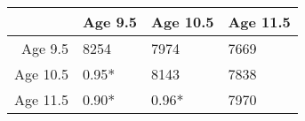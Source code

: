 \begin{table}[ht]
\centering
\begin{tabular}{rlll}
  \hline
 & Age 9.5 & Age 10.5 & Age 11.5 \\ 
  \hline
Age 9.5 & 8254 & 7974 & 7669 \\ 
  Age 10.5 &  0.95*  & 8143 & 7838 \\ 
  Age 11.5 &  0.90*  &  0.96*  & 7970 \\ 
   \hline
\end{tabular}
\end{table}
